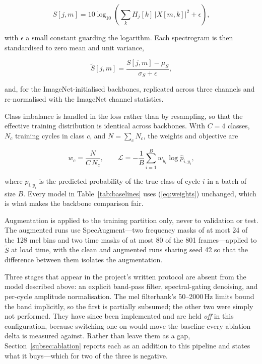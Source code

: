 \documentclass[journal,onecolumn]{IEEEtran}
\begin{document}
\begin{equation}
\label{eq:logmel}
S[j,m] = 10 \log_{10}\!\left( \sum_{k} H_j[k]\,\bigl| X[m,k] \bigr|^{2} + \epsilon \right),
\end{equation}

\noindent with $\epsilon$ a small constant guarding the logarithm. Each spectrogram is
then standardised to zero mean and unit variance,

\begin{equation}
\label{eq:standardize}
\tilde{S}[j,m] = \frac{S[j,m] - \mu_S}{\sigma_S + \epsilon},
\end{equation}

\noindent and, for the ImageNet-initialised backbones, replicated across three
channels and re-normalised with the ImageNet channel statistics.

Class imbalance is handled in the loss rather than by resampling, so that the
effective training distribution is identical across backbones. With $C = 4$ classes,
$N_c$ training cycles in class $c$, and $N = \sum_c N_c$, the weights and objective
are

\begin{equation}
\label{eq:weights}
w_c = \frac{N}{C \, N_c},
\qquad
\mathcal{L} = -\frac{1}{B}\sum_{i=1}^{B} w_{y_i} \log \hat{p}_{i,y_i},
\end{equation}

\noindent where $\hat{p}_{i,y_i}$ is the predicted probability of the true class of
cycle $i$ in a batch of size $B$. Every model in Table~\ref{tab:baselines} uses
(\ref{eq:weights}) unchanged, which is what makes the backbone comparison fair.

Augmentation is applied to the training partition only, never to validation or test.
The augmented runs use SpecAugment---two frequency masks of at most 24 of the 128 mel
bins and two time masks of at most 80 of the 801 frames---applied to
$\tilde{S}$ at load time, with the clean and augmented runs sharing seed 42 so that
the difference between them isolates the augmentation.

Three stages that appear in the project's written protocol are absent from the model
described above: an explicit band-pass filter, spectral-gating denoising, and per-cycle
amplitude normalisation. The mel filterbank's 50--2000\,Hz limits bound the band
implicitly, so the first is partially subsumed; the other two were simply not performed.
They have since been implemented and are held \emph{off} in this configuration, because
switching one on would move the baseline every ablation delta is measured against. Rather
than leave them as a gap, Section~\ref{subsec:ablation} reports each as an addition to
this pipeline and states what it buys---which for two of the three is negative.
\end{document}
